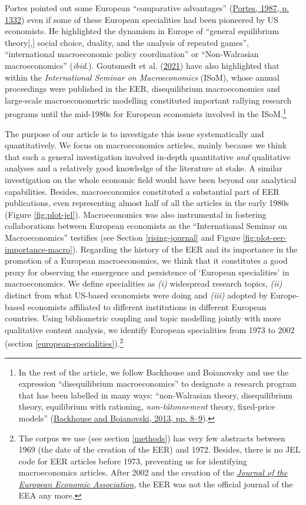 \documentclass[
]{article}
\begin{document}
Portes pointed out some European ``comparative advantages''
(\protect\hyperlink{ref-portes1987}{Portes, 1987, p. 1332}) even if some
of these European specialities had been pioneered by US economists. He
highlighted the dynamism in Europe of ``general equilibrium
theory{[},{]} social choice, duality, and the analysis of repeated
games'', ``international macroeconomic policy coordination'' or
``Non-Walrasian macroeconomics'' (\emph{ibid}.). Goutsmedt et al.
(\protect\hyperlink{ref-goutsmedt2021}{2021}) have also highlighted that
within the \emph{International Seminar on Macroeconomics} (ISoM), whose
annual proceedings were published in the EER, disequilibrium
macroeconomics and large-scale macroeconometric modelling constituted
important rallying research programs until the mid-1980s for European
economists involved in the ISoM.\footnote{In the rest of the article, we
  follow Backhouse and Boianovsky and use the expression
  ``disequilibrium macroeconomics'' to designate a research program that
  has been labelled in many ways: ``non-Walrasian theory, disequilibrium
  theory, equilibrium with rationing, \emph{non-tâtonnement} theory,
  fixed-price models''
  (\protect\hyperlink{ref-backhouseboianovski2013}{Backhouse and
  Boianovski, 2013, pp. 8--9}).}

The purpose of our article is to investigate this issue systematically
and quantitatively. We focus on macroeconomics articles, mainly because
we think that such a general investigation involved in-depth
quantitative \emph{and} qualitative analyses and a relatively good
knowledge of the literature at stake. A similar investigation on the
whole economic field would have been beyond our analytical capabilities.
Besides, macroeconomics constituted a substantial part of EER
publications, even representing almost half of all the articles in the
early 1980s (Figure \ref{fig:plot-jel}). Macroeconomics was also
instrumental in fostering collaborations between European economists as
the ``International Seminar on Macroeconomics'' testifies (see Section
\ref{rising-journal} and Figure \ref{fig:plot-eer-importance-macro}).
Regarding the history of the EER and its importance in the promotion of
a European macroeconomics, we think that it constitutes a good proxy for
observing the emergence and persistence of `European specialities' in
macroeconomics. We define specialities as \emph{(i)} widespread research
topics, \emph{(ii)} distinct from what US-based economists were doing
and \emph{(iii)} adopted by Europe-based economists affiliated to
different institutions in different European countries. Using
bibliometric coupling and topic modelling jointly with more qualitative
content analysis, we identify European specialities from 1973 to 2002
(section \ref{european-specialities}).\footnote{The corpus we use (see
  section \ref{methods}) has very few abstracts between 1969 (the date
  of the creation of the EER) and 1972. Besides, there is no JEL code
  for EER articles before 1973, preventing us for identifying
  macroeconomics articles. After 2002 and the creation of the
  \href{https://academic.oup.com/jeea}{\emph{Journal of the European
  Economic Association}}, the EER was not the official journal of the
  EEA any more.}
\end{document}
